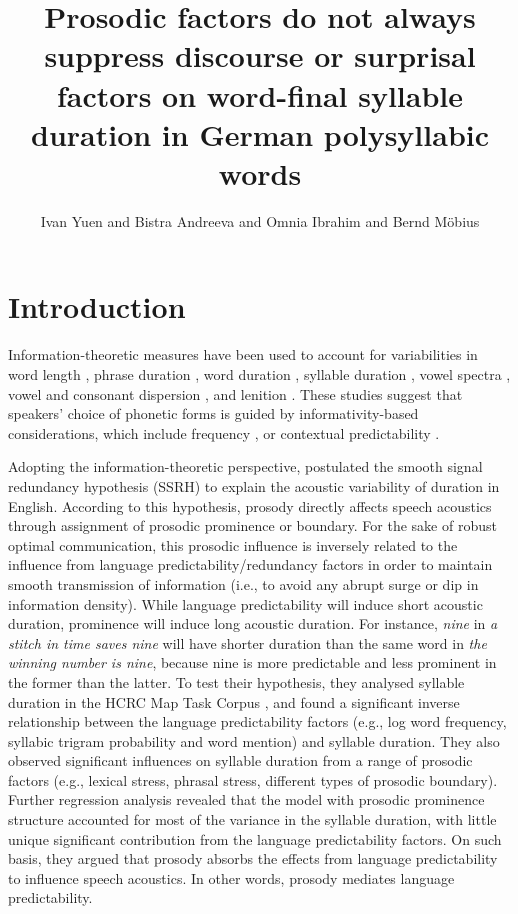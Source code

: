 \documentclass[output=paper,colorlinks,citecolor=brown]{langscibook}
\author{Ivan Yuen\orcid{0000-0002-3238-0402}\affiliation{Saarland University} and Bistra Andreeva\orcid{0000-0003-2774-1346}\affiliation{Saarland University} and Omnia Ibrahim\orcid{0000-0002-3649-7376}\affiliation{Saarland University} and Bernd M{\"o}bius\orcid{0000-0003-3065-9984}\affiliation{Saarland University}}
\title[Word-final syllable duration in German polysyllabic words]{Prosodic factors do not always suppress discourse or surprisal factors on word-final syllable duration in German polysyllabic words}
\begin{document}
\maketitle

\section{Introduction}
Information-theoretic measures have been used to account for variabilities in word length \citep[e.g.,][]{Piantadosi2011}, phrase duration \citep[e.g.,][]{Arnon2013}, word duration \citep[e.g.,][]{Baker2009, Seyfarth2014}, syllable duration \citep[e.g.,][]{vanSon2003, Aylett2004}, vowel spectra \citep[e.g.,][]{Aylett2006, Brandt2021}, vowel and consonant dispersion \citep[e.g.,][]{Malisz2018}, and lenition \citep[e.g.,][]{Cohen2017}. These studies suggest that speakers’ choice of phonetic forms is guided by informativity-based considerations, which include frequency \citep[e.g.,][]{Gahl2008, Arnon2013}, or contextual predictability \citep[e.g.,][]{Aylett2004, Aylett2006, Baker2009, Seyfarth2014, Piantadosi2011}.

Adopting the information-theoretic perspective, \citet{Aylett2004} postulated the smooth signal redundancy hypothesis (SSRH) to explain the acoustic variability of duration in English. According to this hypothesis, prosody directly affects speech acoustics through assignment of prosodic prominence or boundary. For the sake of robust optimal communication, this prosodic influence is inversely related to the influence from language predictability/redundancy factors in order to maintain smooth transmission of information (i.e., to avoid any abrupt surge or dip in information density). While language predictability will induce short acoustic duration, prominence will induce long acoustic duration. For instance, \textit{nine} in \textit{a stitch in time saves nine} will have shorter duration than the same word in \textit{the winning number is nine}, because nine is more predictable and less prominent in the former than the latter. To test their hypothesis, they analysed syllable duration in the HCRC Map Task Corpus \citep{Anderson1991}, and found a significant inverse relationship between the language predictability factors (e.g., log word frequency, syllabic trigram probability and word mention) and syllable duration. They also observed significant influences on syllable duration from a range of prosodic factors (e.g., lexical stress, phrasal stress, different types of prosodic boundary). Further regression analysis revealed that the model with prosodic prominence structure accounted for most of the variance in the syllable duration, with little unique significant contribution from the language predictability factors. On such basis, they argued that prosody absorbs the effects from language predictability to influence speech acoustics. In other words, prosody mediates language predictability. 
\end{document}
